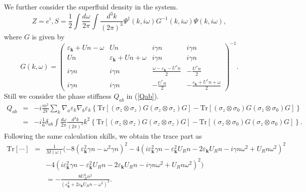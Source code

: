 \documentclass[aps,onecolumn,superscriptaddress,notitlepage,longbibliography]{revtex4-1}
\begin{document}
We further consider the superfluid density in the system.
\begin{equation}
  Z = e^{i}, S = \frac{1}{2} \int \frac{d \omega}{2 \pi} \int \frac{d^3
  k}{(2 \pi)^3} \Psi^{\dagger} (k, i \omega) G^{- 1} (k, i \omega) \Psi (k, i
  \omega),
\end{equation}
where $G$ is given by
\begin{equation}
  G (k, \omega) = \left(\begin{array}{cccc}
    \varepsilon_{\mathbf{k}} + U n - \omega & U n & i \gamma n & i \gamma
    n\\
    U n & \varepsilon_{\mathbf{k}} + U n + \omega & i \gamma n & i \gamma
    n\\
    i \gamma n & i \gamma n & \frac{\omega - \varepsilon_{\mathbf{k}} -
    U^{\ast} n}{2} & - \frac{U^{\ast} n}{2}\\
    i \gamma n & i \gamma n & - \frac{U^{\ast} n}{2} & -
    \frac{\varepsilon_{\mathbf{k}} + U^{\ast} n + \omega}{2}
  \end{array}\right)^{- 1} .
\end{equation}
Still we consider the phase stiffness $Q_{a b}$ in (\ref{Qab}).
\begin{eqnarray}
  Q_{a b} & = & - i\frac{m^2}{2 V} \sum_k \nabla_a \varepsilon_k \nabla_b
  \varepsilon_k \left\{ \text{Tr} [(\sigma_z \otimes \sigma_z) G (\sigma_z
  \otimes \sigma_z) G] - \text{Tr} [(\sigma_z \otimes \sigma_0) G (\sigma_z
  \otimes \sigma_0) G] \right\} \nonumber\\
  & = & - i\frac{1}{6} \delta_{a b} \int \frac{d \omega}{2 \pi} \frac{d^3
  k}{(2 \pi)^3} k^2 \left\{ \text{Tr} [(\sigma_z \otimes \sigma_z) G (\sigma_z
  \otimes \sigma_z) G] - \text{Tr} [(\sigma_z \otimes \sigma_0) G (\sigma_z
  \otimes \sigma_0) G] \right\} . 
\end{eqnarray}
Following the same calculation skills, we obtain the trace part as
\begin{eqnarray}
  \text{Tr} [\cdots] & = & \frac{1}{M (\omega)} (- 8
  (\varepsilon_{\mathbf{k}}^2 \gamma n - \omega^2 \gamma n)^2 - 4 (i
  \varepsilon_{\mathbf{k}}^2 \gamma n - \varepsilon_{\mathbf{k}}^2 U_R n -
  2 \varepsilon_{\mathbf{k}} U_R n - i \gamma n \omega^2 + U_R n \omega^2)^2
   \nonumber\\
  &  & - 4 (i \varepsilon_{\mathbf{k}}^2 \gamma n -
  \varepsilon_{\mathbf{k}}^2 U_R n - 2 \varepsilon_{\mathbf{k}} U_R n - i
  \gamma n \omega^2 + U_R n \omega^2)^2 ) \nonumber\\
  &  & = - \frac{8 U_R^2 n^2}{(\varepsilon_{\mathbf{k}}^2 + 2
  \varepsilon_{\mathbf{k}} U_R n - \omega^2)^2} . 
\end{eqnarray}
\end{document}
